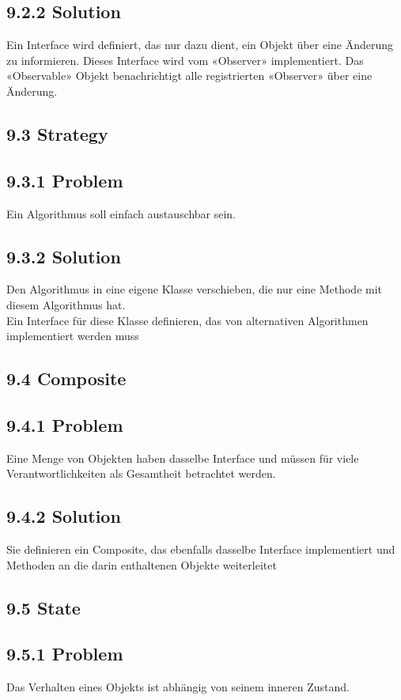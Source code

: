 \subsection*{9.2.2 Solution}
Ein Interface wird definiert, das nur dazu dient, ein Objekt über eine Änderung zu informieren. Dieses Interface wird vom «Observer» implementiert. Das\\
«Observable» Objekt benachrichtigt alle registrierten «Observer» über eine Änderung.

\subsection*{9.3 Strategy}
\subsection*{9.3.1 Problem}
Ein Algorithmus soll einfach austauschbar sein.

\subsection*{9.3.2 Solution}
Den Algorithmus in eine eigene Klasse verschieben, die nur eine Methode mit diesem Algorithmus hat.\\
Ein Interface für diese Klasse definieren, das von alternativen Algorithmen implementiert werden muss

\subsection*{9.4 Composite}
\subsection*{9.4.1 Problem}
Eine Menge von Objekten haben dasselbe Interface und müssen für viele Verantwortlichkeiten als Gesamtheit betrachtet werden.

\subsection*{9.4.2 Solution}
Sie definieren ein Composite, das ebenfalls dasselbe Interface implementiert und Methoden an die darin enthaltenen Objekte weiterleitet

\subsection*{9.5 State}
\subsection*{9.5.1 Problem}
Das Verhalten eines Objekts ist abhängig von seinem inneren Zustand.

